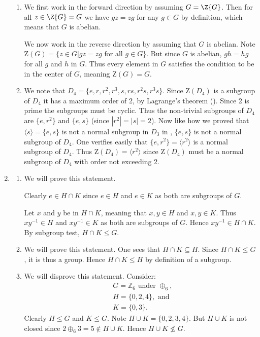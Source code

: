 \begin{enumerate}
\begin{enumerate}[label=(\alph*)]
        \item We first work in the forward direction by assuming $G = \Z{G}$. Then for all $z \in \Z{G} = G$ we have $gz = zg$ for any $g \in G$ by definition, which means that $G$ is abelian.

        We now work in the reverse direction by assuming that $G$ is abelian. Note $\mathrm{Z}(G) = \{z \in G \vert gz = zg \text{ for all } g \in G\}$. But since $G$ is abelian, $gh = hg$ for all $g$ and $h$ in $G$. Thus every element in $G$ satisfies the condition to be in the center of $G$, meaning $\mathrm{Z}(G) = G$.

        \item We note that $D_4 = \{e, r, r^2, r^3, s, rs, r^2s, r^3s\}$. Since $\mathrm{Z}(D_4)$ is a subgroup of $D_4$ it has a maximum order of 2, by Lagrange's theorem (). Since 2 is prime the subgroups must be cyclic. Thus the non-trivial subgroups of $D_4$ are $\{e, r^2\}$ and $\{e, s\}$ (since $|r^2| = |s| = 2$). Now like how we proved that $\langle s \rangle = \{e, s\}$ is not a normal subgroup in $D_3$ in , $\{e, s\}$ is not a normal subgroup of $D_4$. One verifies easily that $\{e, r^2\} = \langle r^2 \rangle$ is a normal subgroup of $D_4$. Thus $\mathrm{Z}(D_4) = \langle r^2 \rangle$ since $\mathrm{Z}(D_4)$ must be a normal subgroup of $D_4$ with order not exceeding 2.
    \end{enumerate}

    \item \begin{enumerate}[label=(\alph*)]
        \item We will prove this statement.

        Clearly $e \in H \cap K$ since $e \in H$ and $e \in K$ as both are subgroups of $G$.

        Let $x$ and $y$ be in $H \cap K$, meaning that $x, y \in H$ and $x, y \in K$. Thus $xy^{-1} \in H$ and $xy^{-1} \in K$ as both are subgroups of $G$. Hence $xy^{-1} \in H \cap K$.
        By subgroup test, $H \cap K \leq G$.

        \item We will prove this statement. One sees that $H \cap K \subseteq H$. Since $H \cap K \leq G$, it is thus a group. Hence $H \cap K \leq H$ by definition of a subgroup.

        \item We will disprove this statement. Consider:
        \begin{align*}
            &G = \mathbb{Z}_6 \text{ under }\oplus_6,\\
            &H = \{0, 2, 4\},\text{ and}\\
            &K = \{0, 3\}.
        \end{align*}
        Clearly $H \leq G$ and $K \leq G$. Note $H \cup K = \{0, 2, 3, 4\}$. But $H \cup K$ is not closed since $2 \oplus_6 3 = 5 \not \in H \cup K$. Hence $H \cup K \not\leq G$.


\end{enumerate}
\end{enumerate}
